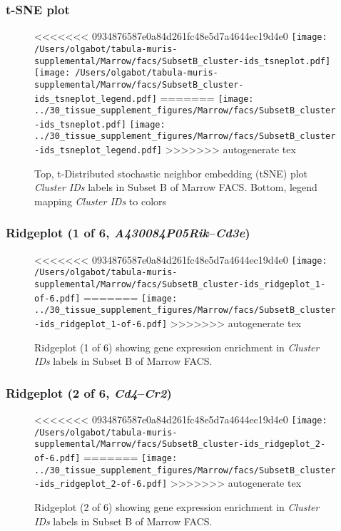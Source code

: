 \subsubsection{t-SNE plot}
\begin{figure}[h]
\centering
<<<<<<< 0934876587e0a84d261fc48e5d7a4644ec19d4e0
\texttt{[image: /Users/olgabot/tabula-muris-supplemental/Marrow/facs/SubsetB\_cluster-ids\_tsneplot.pdf]}
\texttt{[image: /Users/olgabot/tabula-muris-supplemental/Marrow/facs/SubsetB\_cluster-ids\_tsneplot\_legend.pdf]}
=======
\texttt{[image: ../30\_tissue\_supplement\_figures/Marrow/facs/SubsetB\_cluster-ids\_tsneplot.pdf]}
\texttt{[image: ../30\_tissue\_supplement\_figures/Marrow/facs/SubsetB\_cluster-ids\_tsneplot\_legend.pdf]}
>>>>>>> autogenerate tex
\caption{Top, t-Distributed stochastic neighbor embedding (tSNE) plot  \emph{Cluster IDs} labels in Subset B of Marrow FACS. Bottom, legend mapping \emph{Cluster IDs} to colors}
\end{figure}


\clearpage

\subsubsection{Ridgeplot (1 of 6, \emph{A430084P05Rik}--\emph{Cd3e})}
\begin{figure}[h]
\centering
<<<<<<< 0934876587e0a84d261fc48e5d7a4644ec19d4e0
\texttt{[image: /Users/olgabot/tabula-muris-supplemental/Marrow/facs/SubsetB\_cluster-ids\_ridgeplot\_1-of-6.pdf]}
=======
\texttt{[image: ../30\_tissue\_supplement\_figures/Marrow/facs/SubsetB\_cluster-ids\_ridgeplot\_1-of-6.pdf]}
>>>>>>> autogenerate tex

\caption{ Ridgeplot (1 of 6)  showing gene expression enrichment in \emph{Cluster IDs} labels in Subset B of Marrow FACS. }
\end{figure}


\clearpage

\subsubsection{Ridgeplot (2 of 6, \emph{Cd4}--\emph{Cr2})}
\begin{figure}[h]
\centering
<<<<<<< 0934876587e0a84d261fc48e5d7a4644ec19d4e0
\texttt{[image: /Users/olgabot/tabula-muris-supplemental/Marrow/facs/SubsetB\_cluster-ids\_ridgeplot\_2-of-6.pdf]}
=======
\texttt{[image: ../30\_tissue\_supplement\_figures/Marrow/facs/SubsetB\_cluster-ids\_ridgeplot\_2-of-6.pdf]}
>>>>>>> autogenerate tex

\caption{ Ridgeplot (2 of 6)  showing gene expression enrichment in \emph{Cluster IDs} labels in Subset B of Marrow FACS. }
\end{figure}


